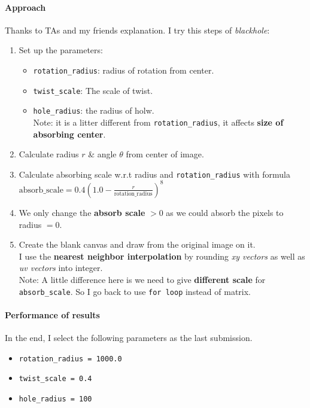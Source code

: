 \paragraph{Approach}
Thanks to TAs and my friends explanation. I try this steps of \textit{blackhole}:
\begin{enumerate}
    \item Set up the parameters:
    \begin{itemize}
        \item \texttt{rotation\_radius}: radius of rotation from center.
        \item \texttt{twist\_scale}: The scale of twist.
        \item \texttt{hole\_radius}: the radius of holw. \\
        Note: it is a litter different from \texttt{rotation\_radius}, it affects \textbf{size of absorbing center}.
    \end{itemize}
    \item Calculate radius $r$ \& angle $\theta$ from center of image.
    \item Calculate \alert{absorbing scale} w.r.t radius and \texttt{rotation\_radius} with formula \\
    \(\mbox{absorb\_scale} = 0.4(1.0 - \frac{r}{\mbox{rotation\_radius}})^8\)
    \item We only change the \textbf{absorb scale} $>0$ as we could absorb the pixels to radius $=0$.
    \item Create the blank canvas and draw from the original image on it. \\
    I use the \textbf{nearest neighbor interpolation} by rounding \textit{xy vectors} as well as \textit{uv vectors} into integer. \\
    Note: A little difference here is we need to give \textbf{different scale} for \texttt{absorb\_scale}. So I go back to use \texttt{for loop} instead of matrix.
\end{enumerate}

\paragraph{Performance of results}
In the end, I select the following parameters as the last submission.
\begin{itemize}
    \item \texttt{rotation\_radius = 1000.0}
    \item \texttt{twist\_scale = 0.4}
    \item \texttt{hole\_radius = 100}
\end{itemize}

